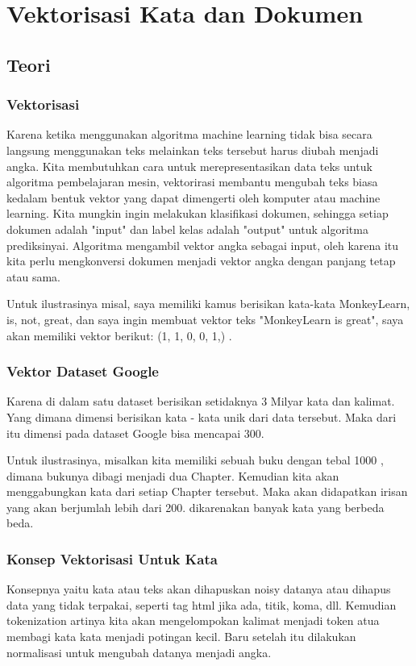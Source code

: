 \chapter{Vektorisasi Kata dan Dokumen}

\section{Teori}
\subsection{Vektorisasi}
Karena ketika menggunakan algoritma machine learning tidak bisa  secara langsung menggunakan teks melainkan teks tersebut harus diubah menjadi angka. Kita membutuhkan cara untuk merepresentasikan data teks untuk algoritma pembelajaran mesin, vektorirasi membantu mengubah teks biasa kedalam bentuk vektor yang dapat dimengerti oleh komputer atau machine learning. Kita mungkin ingin melakukan klasifikasi dokumen, sehingga setiap dokumen adalah "input" dan label kelas adalah "output" untuk algoritma prediksinyai. Algoritma mengambil vektor angka sebagai input, oleh karena itu kita perlu mengkonversi dokumen menjadi vektor angka dengan panjang tetap atau sama.
\par Untuk ilustrasinya misal,  saya memiliki kamus berisikan kata-kata {MonkeyLearn, is, not, great}, dan saya ingin membuat vektor teks "MonkeyLearn is great", saya akan memiliki vektor berikut: (1, 1, 0, 0, 1,) .

\subsection{Vektor Dataset Google}
Karena di dalam satu dataset berisikan setidaknya 3 Milyar kata dan kalimat. Yang dimana dimensi berisikan kata - kata unik dari data tersebut. Maka dari itu dimensi pada dataset Google bisa mencapai 300.

Untuk ilustrasinya, misalkan kita memiliki sebuah buku dengan tebal 1000 , dimana bukunya dibagi menjadi dua Chapter. Kemudian kita akan menggabungkan kata dari setiap Chapter tersebut. Maka akan didapatkan irisan yang akan berjumlah lebih dari 200. dikarenakan banyak kata yang berbeda beda.

\subsection{Konsep Vektorisasi Untuk Kata}
Konsepnya yaitu kata atau teks akan dihapuskan noisy datanya atau dihapus data yang tidak terpakai, seperti tag html jika ada, titik, koma, dll. Kemudian tokenization artinya kita akan mengelompokan kalimat menjadi token atua membagi kata kata menjadi potingan kecil. Baru setelah itu dilakukan normalisasi untuk mengubah datanya menjadi angka.

